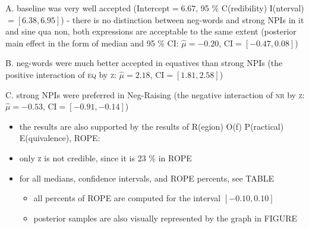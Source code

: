 \documentclass[
  ignorenonframetext,
]{beamer}
\providecommand{\tightlist}{%
  \setlength{\itemsep}{0pt}\setlength{\parskip}{0pt}}\usepackage{longtable,booktabs,array}
\begin{document}
\begin{frame}
A. baseline was very well accepted (\(\mathrm{Intercept}=6.67\), 95 \%
C(redibility) I(nterval)\(=[6.38, 6.95]\)) - there is no distinction
between neg-words and strong NPIs in it and sine qua non, both
expressions are acceptable to the same extent (posterior main effect in
the form of median and 95 \% CI: \(\hat{\mu}=-0.20\),
\(\mathrm{CI}=[-0.47, 0.08]\))

B. neg-words were much better accepted in equatives than strong NPIs
(the positive interaction of \textsc{eq} by \textsc{z}:
\(\hat{\mu}=2.18\), \(\mathrm{CI}=[1.81, 2.58]\))

C. strong NPIs were preferred in Neg-Raising (the negative interaction
of \textsc{nr} by \textsc{z}: \(\hat{\mu}=-0.53\),
\(\mathrm{CI}=[-0.91, -0.14]\))
\end{frame}

\begin{frame}
\begin{itemize}
\tightlist
\item
  the results are also supported by the results of R(egion) O(f)
  P(ractical) E(quivalence), ROPE:
\item
  only \textsc{z} is not credible, since it is 23 \% in ROPE
\item
  for all medians, confidence intervals, and ROPE percents, see TABLE

  \begin{itemize}
  \tightlist
  \item
    all percents of ROPE are computed for the interval \([-0.10, 0.10]\)
  \item
    posterior samples are also visually represented by the graph in
    FIGURE
  \end{itemize}
\end{itemize}
\end{frame}
\end{document}
